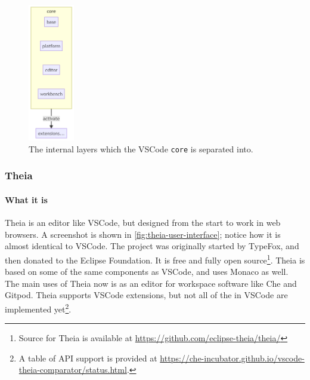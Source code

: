 \begin{figure}[htbp]
  \centering
  \includegraphics[width=2cm]{figures/vscode-layers-architecture}
  \caption[VSCode Layers]{The internal layers which the VSCode \texttt{core} is separated into.~\cite{benjaminpaseroSourceCodeOrganization2020}}\label{fig:vscode-layers-architecture}
\end{figure}



\subsubsection{Theia}\label{sec:theia}

\paragraph*{What it is}
\Gls{Theia} is an editor like \gls{VSCode}, but designed from the start to work in web browsers.
A screenshot is shown in \cref{fig:theia-user-interface}; notice how it is almost identical to \gls{VSCode}.
The project was originally started by TypeFox, and then donated to the Eclipse Foundation.
It is free and fully \gls{open source}\footnote{Source for Theia is available at \href{https://github.com/eclipse-theia/theia/}{https://github.com/eclipse-theia/theia/}}.
\Gls{Theia} is based on some of the same components as \gls{VSCode}, and uses Monaco as well.
The main uses of Theia now is as an editor for workspace software like \gls{Che} and \gls{Gitpod}.
Theia supports VSCode extensions, but not all of the  in VSCode are implemented yet\footnote{A table of \acrshort{API} support is provided at \href{https://che-incubator.github.io/vscode-theia-comparator/status.html}{https://che-incubator.github.io/vscode-theia-comparator/status.html}.}.

